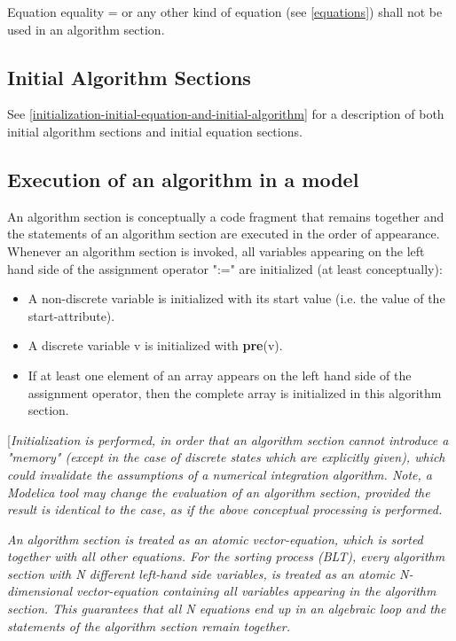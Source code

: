 \documentclass[10pt,a4paper]{report}
\def\doublelabel#1{\label{#1}\hypertarget{#1}{}}
\begin{document}
Equation equality = or any other kind of equation (see \ref{equations}) shall
not be used in an algorithm section.

\subsection{Initial Algorithm Sections}\doublelabel{initial-algorithm-sections}

See \ref{initialization-initial-equation-and-initial-algorithm} for a description of both initial algorithm sections and
initial equation sections.

\subsection{Execution of an algorithm in a model}\doublelabel{execution-of-an-algorithm-in-a-model}

An algorithm section is conceptually a code fragment that remains
together and the statements of an algorithm section are executed in the
order of appearance. Whenever an algorithm section is invoked, all
variables appearing on the left hand side of the assignment operator
":=" are initialized (at least conceptually):

\begin{itemize}
\item
  A non-discrete variable is initialized with its start value (i.e. the
  value of the start-attribute).
\item
  A discrete variable v is initialized with \textbf{pre}(v).
\item
  If at least one element of an array appears on the left hand side of
  the assignment operator, then the complete array is initialized in
  this algorithm section.
\end{itemize}

{[}\emph{Initialization is performed, in order that an algorithm section
cannot introduce a "memory" (except in the case of discrete states which
are explicitly given), which could invalidate the assumptions of a
numerical integration algorithm. Note, a Modelica tool may change the
evaluation of an algorithm section, provided the result is identical to
the case, as if the above conceptual processing is performed.}

\emph{An algorithm section is treated as an atomic vector-equation,
which is sorted together with all other equations. For the sorting
process (BLT), every algorithm section with N different left-hand side
variables, is treated as an atomic N-dimensional vector-equation
containing all variables appearing in the algorithm section. This
guarantees that all N equations end up in an algebraic loop and the
statements of the algorithm section remain together.}
\end{document}
